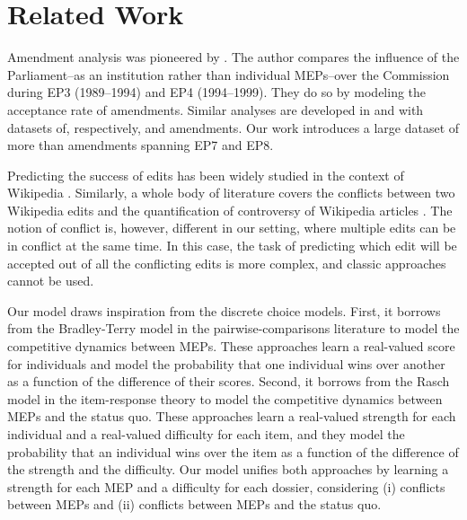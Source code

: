 \section{Related Work}
\label{sec:relwork}

Amendment analysis was pioneered by \cite{kreppel1999affects}.
The author compares the influence of the Parliament--as an institution rather than individual MEPs--over the Commission during EP3 (1989--1994) and EP4 (1994--1999).
They do so by modeling the acceptance rate of  amendments.
Similar analyses are developed in \cite{tsebelis2001legislative} and \cite{kreppel2002moving} with datasets of, respectively,  and  amendments.
Our work introduces a large dataset of more than  amendments spanning EP7 and EP8.

Predicting the success of edits has been widely studied in the context of Wikipedia \cite{druck2008learning,adler2007content,yardim2018can}.
Similarly, a whole body of literature covers the conflicts between two Wikipedia edits \cite{sumi2011edit,yasseri2012dynamics} and the quantification of controversy of Wikipedia articles \cite{sepehri2012leveraging,rad2012identifying}.
The notion of conflict is, however, different in our setting, where multiple edits can be in conflict at the same time.
In this case, the task of predicting which edit will be accepted out of all the conflicting edits is more complex, and classic approaches cannot be used.

Our model draws inspiration from the discrete choice models.
First, it borrows from the Bradley-Terry model in the pairwise-comparisons literature \cite{zermelo1928berechnung,thurstone1927method,bradley1952rank} to model the competitive dynamics between MEPs.
These approaches learn a real-valued score for individuals and model the probability that one individual wins over another as a function of the difference of their scores.
Second, it borrows from the Rasch model in the item-response theory \cite{rasch1960probabilistic} to model the competitive dynamics between MEPs and the status quo.
These approaches learn a real-valued strength for each individual and a real-valued difficulty for each item, and they model the probability that an individual wins over the item as a function of the difference of the strength and the difficulty.
Our model unifies both approaches by learning a strength for each MEP and a difficulty for each dossier, considering (i) conflicts between MEPs and (ii) conflicts between MEPs and the status quo.
